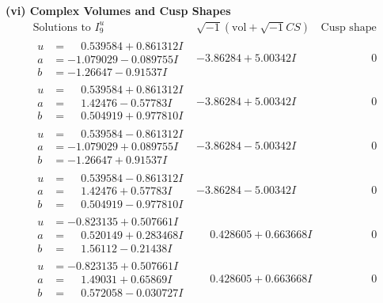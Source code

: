 \documentclass[1p]{elsarticle_modified}
\theoremstyle{definition}
\newcommand{\I}{\sqrt{-1}}
\begin{document}
\newpage\flushleft \textbf{(vi) Complex Volumes and Cusp Shapes}
$$\begin{array}{c|c|c}  
\text{Solutions to }I^u_{9}& \I (\text{vol} + \sqrt{-1}CS) & \text{Cusp shape}\\
 \hline 
\begin{aligned}
u &= \phantom{-}0.539584 + 0.861312 I \\
a &= -1.079029 - 0.089755 I \\
b &= -1.26647 - 0.91537 I\end{aligned}
 & -3.86284 + 5.00342 I & \phantom{-0.000000 } 0 \\ \hline\begin{aligned}
u &= \phantom{-}0.539584 + 0.861312 I \\
a &= \phantom{-}1.42476 - 0.57783 I \\
b &= \phantom{-}0.504919 + 0.977810 I\end{aligned}
 & -3.86284 + 5.00342 I & \phantom{-0.000000 } 0 \\ \hline\begin{aligned}
u &= \phantom{-}0.539584 - 0.861312 I \\
a &= -1.079029 + 0.089755 I \\
b &= -1.26647 + 0.91537 I\end{aligned}
 & -3.86284 - 5.00342 I & \phantom{-0.000000 } 0 \\ \hline\begin{aligned}
u &= \phantom{-}0.539584 - 0.861312 I \\
a &= \phantom{-}1.42476 + 0.57783 I \\
b &= \phantom{-}0.504919 - 0.977810 I\end{aligned}
 & -3.86284 - 5.00342 I & \phantom{-0.000000 } 0 \\ \hline\begin{aligned}
u &= -0.823135 + 0.507661 I \\
a &= \phantom{-}0.520149 + 0.283468 I \\
b &= \phantom{-}1.56112 - 0.21438 I\end{aligned}
 & \phantom{-}0.428605 + 0.663668 I & \phantom{-0.000000 } 0 \\ \hline\begin{aligned}
u &= -0.823135 + 0.507661 I \\
a &= \phantom{-}1.49031 + 0.65869 I \\
b &= \phantom{-}0.572058 - 0.030727 I\end{aligned}
 & \phantom{-}0.428605 + 0.663668 I & \phantom{-0.000000 } 0 \\ \hline\begin{aligned}

\end{aligned}
\end{array}$$
\end{document}
